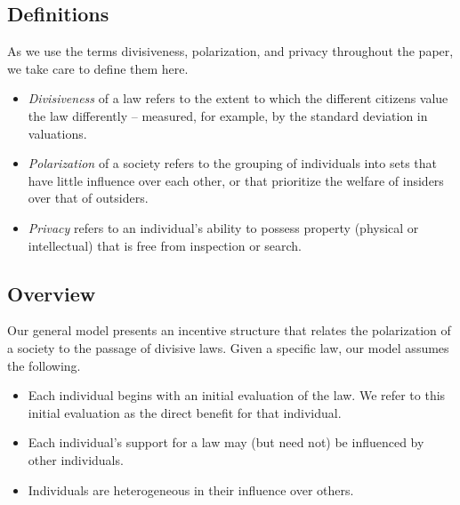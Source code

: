 \subsection{Definitions}
As we use the terms divisiveness, polarization, and privacy throughout the paper, we take care to define them here.

\begin{itemize}
\item  \emph{Divisiveness} of a law refers to the extent to which the different citizens value the law differently -- measured, for example, by the standard deviation in valuations.

\item \emph{Polarization} of a society refers to the grouping of individuals into sets that have little influence over each other, or that prioritize the welfare of insiders over that of outsiders.

\item \emph{Privacy} refers to an individual's ability to possess property (physical or intellectual) that is free from inspection or search. 

\end{itemize}

\subsection{Overview}
Our general model presents an incentive structure that relates the polarization of a society to the passage of divisive laws. Given a specific law, our model assumes the following. 
\begin{itemize}
\item Each individual begins with an initial evaluation of the law. We refer to this initial evaluation as the direct benefit for that individual.
\item Each individual's support for a law may (but need not) be influenced by other individuals.
\item Individuals are heterogeneous in their influence over others.
\end{itemize}

